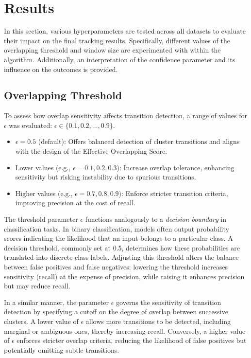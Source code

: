 \chapter{Results}\label{ch:results}
In this section, various hyperparameters are tested across all datasets to
evaluate their impact on the final tracking results. Specifically, different
values of the overlapping threshold and window size are experimented with
within the algorithm. Additionally, an interpretation of the confidence
parameter and its influence on the outcomes is provided.

\section{Overlapping Threshold}
To assess how overlap sensitivity affects transition detection, a range of
values for $\epsilon$ was evaluated: $\epsilon \in \{0.1, 0.2, \dots, 0.9\}$.

\begin{itemize}
      \item $\epsilon = 0.5$ (default): Offers balanced detection of cluster
            transitions and aligns with the design of the Effective Overlapping Score.
      \item Lower values (e.g., $\epsilon = 0.1, 0.2, 0.3$): Increase overlap tolerance,
            enhancing sensitivity but risking instability due to spurious transitions.
      \item Higher values (e.g., $\epsilon = 0.7, 0.8, 0.9$): Enforce stricter transition
            criteria, improving precision at the cost of recall.
\end{itemize}

The threshold parameter $\epsilon$ functions analogously to a \textit{decision
      boundary} in classification tasks. In binary classification, models often
output probability scores indicating the likelihood that an input belongs to a
particular class. A decision threshold, commonly set at 0.5, determines how
these probabilities are translated into discrete class labels. Adjusting this
threshold alters the balance between false positives and false negatives:
lowering the threshold increases sensitivity (recall) at the expense of
precision, while raising it enhances precision but may reduce recall.

In a similar manner, the parameter $\epsilon$ governs the sensitivity of transition
detection by specifying a cutoff on the degree of overlap between successive
clusters. A lower value of $\epsilon$ allows more transitions to be detected,
including marginal or ambiguous ones, thereby increasing recall. Conversely, a
higher value of $\epsilon$ enforces stricter overlap criteria, reducing the
likelihood of false positives but potentially omitting subtle transitions.

